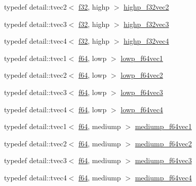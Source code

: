 \begin{CompactItemize}
\item 
typedef detail::tvec2$<$ \hyperlink{group__gtc__type__precision_g0ec999b57f5330d9021256e96038df04}{f32}, highp $>$ \hyperlink{group__gtc__type__precision_gbba3e1b3ae0bcaa7aaac573c08c2f8d3}{highp\_\-f32vec2}
\item 
typedef detail::tvec3$<$ \hyperlink{group__gtc__type__precision_g0ec999b57f5330d9021256e96038df04}{f32}, highp $>$ \hyperlink{group__gtc__type__precision_g581a4a4eb1f3a269d16af0c4e2d8daf4}{highp\_\-f32vec3}
\item 
typedef detail::tvec4$<$ \hyperlink{group__gtc__type__precision_g0ec999b57f5330d9021256e96038df04}{f32}, highp $>$ \hyperlink{group__gtc__type__precision_g53d3c1a17e2e6f26ee5ad1e8879d710e}{highp\_\-f32vec4}
\item 
typedef detail::tvec1$<$ \hyperlink{group__gtc__type__precision_g2bba392e555124b36cde6abba349bab3}{f64}, lowp $>$ \hyperlink{group__gtc__type__precision_g47d9eed23b6e3fc58676176be392293a}{lowp\_\-f64vec1}
\item 
typedef detail::tvec2$<$ \hyperlink{group__gtc__type__precision_g2bba392e555124b36cde6abba349bab3}{f64}, lowp $>$ \hyperlink{group__gtc__type__precision_gf2c6cba98bb2c2f1560d8edff4b70938}{lowp\_\-f64vec2}
\item 
typedef detail::tvec3$<$ \hyperlink{group__gtc__type__precision_g2bba392e555124b36cde6abba349bab3}{f64}, lowp $>$ \hyperlink{group__gtc__type__precision_gd2d5e1436d926ae7201c860dce01a0fe}{lowp\_\-f64vec3}
\item 
typedef detail::tvec4$<$ \hyperlink{group__gtc__type__precision_g2bba392e555124b36cde6abba349bab3}{f64}, lowp $>$ \hyperlink{group__gtc__type__precision_gf99497c42a2d011fecab7f3f2312213d}{lowp\_\-f64vec4}
\item 
typedef detail::tvec1$<$ \hyperlink{group__gtc__type__precision_g2bba392e555124b36cde6abba349bab3}{f64}, mediump $>$ \hyperlink{group__gtc__type__precision_g1e3bbbd9ce5e215c4ba0980264b2711d}{mediump\_\-f64vec1}
\item 
typedef detail::tvec2$<$ \hyperlink{group__gtc__type__precision_g2bba392e555124b36cde6abba349bab3}{f64}, mediump $>$ \hyperlink{group__gtc__type__precision_g892891863b8e50195e3e48077a329335}{mediump\_\-f64vec2}
\item 
typedef detail::tvec3$<$ \hyperlink{group__gtc__type__precision_g2bba392e555124b36cde6abba349bab3}{f64}, mediump $>$ \hyperlink{group__gtc__type__precision_ge2832f9acbf0cc1071fcf93336db6e0c}{mediump\_\-f64vec3}
\item 
typedef detail::tvec4$<$ \hyperlink{group__gtc__type__precision_g2bba392e555124b36cde6abba349bab3}{f64}, mediump $>$ \hyperlink{group__gtc__type__precision_g0e011facac062fd7fb9b40c7d8288310}{mediump\_\-f64vec4}

\end{CompactItemize}
